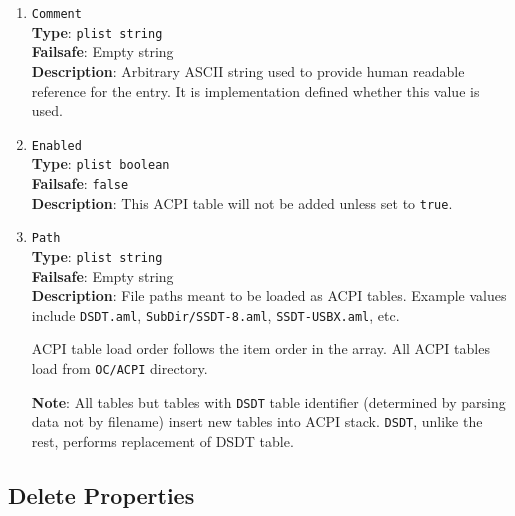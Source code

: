 \documentclass[]{article}
\begin{document}
\begin{enumerate}
\item
  \texttt{Comment}\\
  \textbf{Type}: \texttt{plist\ string}\\
  \textbf{Failsafe}: Empty string\\
  \textbf{Description}: Arbitrary ASCII string used to provide human readable
  reference for the entry. It is implementation defined whether this value is
  used.

\item
  \texttt{Enabled}\\
  \textbf{Type}: \texttt{plist\ boolean}\\
  \textbf{Failsafe}: \texttt{false}\\
  \textbf{Description}: This ACPI table will not be added unless set to
  \texttt{true}.

\item
  \texttt{Path}\\
  \textbf{Type}: \texttt{plist\ string}\\
  \textbf{Failsafe}: Empty string\\
  \textbf{Description}: File paths meant to be loaded as ACPI tables.
  Example values include \texttt{DSDT.aml}, \texttt{SubDir/SSDT-8.aml},
  \texttt{SSDT-USBX.aml}, etc.

  ACPI table load order follows the item order in the array. All ACPI tables
  load from \texttt{OC/ACPI} directory.

  \textbf{Note}: All tables but tables with \texttt{DSDT} table identifier
  (determined by parsing data not by filename) insert new tables into ACPI stack.
  \texttt{DSDT}, unlike the rest, performs replacement of DSDT table.

\end{enumerate}

\subsection{Delete Properties}\label{acpipropsdelete}
\end{document}
